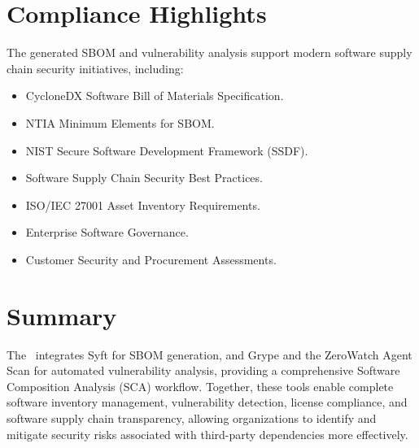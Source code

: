 \vspace{0.4cm}


\section{Compliance Highlights}

The generated SBOM and vulnerability analysis support modern software supply chain security initiatives, including:
\begin{itemize}
\item CycloneDX Software Bill of Materials Specification.
\item NTIA Minimum Elements for SBOM.
\item NIST Secure Software Development Framework (SSDF).
\item Software Supply Chain Security Best Practices.
\item ISO/IEC 27001 Asset Inventory Requirements.
\item Enterprise Software Governance.
\item Customer Security and Procurement Assessments.
\end{itemize}

\vspace{0.4cm}


\section{Summary}

The \ProjectName\ integrates Syft for SBOM generation, and Grype and the ZeroWatch Agent Scan for automated vulnerability analysis, providing a comprehensive Software Composition Analysis (SCA) workflow. Together, these tools enable complete software inventory management, vulnerability detection, license compliance, and software supply chain transparency, allowing organizations to identify and mitigate security risks associated with third-party dependencies more effectively.